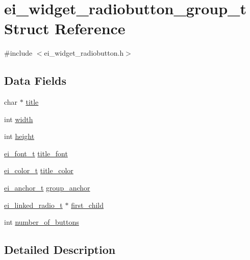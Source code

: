 \hypertarget{structei__widget__radiobutton__group__t}{}\section{ei\+\_\+widget\+\_\+radiobutton\+\_\+group\+\_\+t Struct Reference}
\label{structei__widget__radiobutton__group__t}


{\ttfamily \#include $<$ei\+\_\+widget\+\_\+radiobutton.\+h$>$}

\subsection*{Data Fields}
\begin{DoxyCompactItemize}
\item 
char $\ast$ \hyperlink{structei__widget__radiobutton__group__t_ab371dbbe211d79b307468eb357323528}{title}
\item 
int \hyperlink{structei__widget__radiobutton__group__t_af7a2df06a7d11d5c4025dc2a44b684ed}{width}
\item 
int \hyperlink{structei__widget__radiobutton__group__t_a21da9b4daa8640d6f93ae32ee107285b}{height}
\item 
\hyperlink{ei__types_8h_a22c8198e4d641e4bc67bb17f9c6bcda7}{ei\+\_\+font\+\_\+t} \hyperlink{structei__widget__radiobutton__group__t_ac914d35e11bbc7cef1152f35457f4a0f}{title\+\_\+font}
\item 
\hyperlink{structei__color__t}{ei\+\_\+color\+\_\+t} \hyperlink{structei__widget__radiobutton__group__t_a91f948256ce4820e81d7b26cf28852be}{title\+\_\+color}
\item 
\hyperlink{ei__types_8h_a3852c963af609d31d7cfcff79c4c8450}{ei\+\_\+anchor\+\_\+t} \hyperlink{structei__widget__radiobutton__group__t_a0025c6979e1aabdaaf306735a427b5a7}{group\+\_\+anchor}
\item 
\hyperlink{structei__linked__radio__t}{ei\+\_\+linked\+\_\+radio\+\_\+t} $\ast$ \hyperlink{structei__widget__radiobutton__group__t_ac92bf950038767cd751c165a3ba4d016}{first\+\_\+child}
\item 
int \hyperlink{structei__widget__radiobutton__group__t_af3ad50c4d449c075302019229b34bf4f}{number\+\_\+of\+\_\+buttons}
\end{DoxyCompactItemize}


\subsection{Detailed Description}


